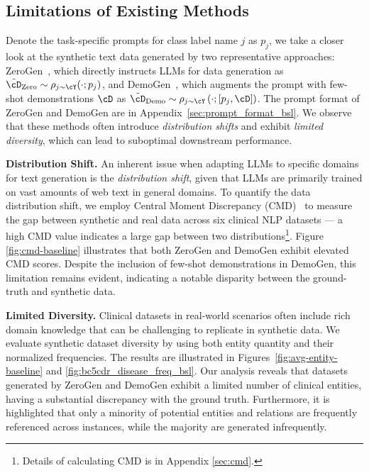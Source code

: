 \vspace{-0.5ex}
\subsection{Limitations of Existing  Methods}
\label{sec:limitations}
Denote the task-specific prompts for class label name $j$ as $p_j$, we take a closer look at the synthetic text data generated by two representative approaches: ZeroGen~\citep{ye2022zerogen}, which directly instructs LLMs for data generation as  $\tilde{\cD}_{\text{Zero}} \sim \rho_{j\sim\cY}(\cdot; p_j)$, and DemoGen~\citep{gpt3mix,meng2023tuning}, which augments the prompt with few-shot demonstrations $\cD$ as $\tilde{\cD}_{\text{Demo}} \sim \rho_{j\sim\cY}\left(\cdot; [p_j, \cD]\right)$.
The prompt format of ZeroGen and DemoGen are in Appendix~\ref{sec:prompt_format_bsl}.
We observe that these methods often introduce \textit{distribution shifts} and exhibit \textit{limited diversity}, which can lead to suboptimal downstream performance. 

\noindent \textbf{Distribution Shift.} An inherent issue when adapting LLMs to specific domains for text generation is the \emph{distribution shift}, given that LLMs are primarily trained on vast amounts of web text in general domains. 
To quantify the data distribution shift, we employ Central Moment Discrepancy (CMD)~\citep{zellinger2017central} to measure the gap between synthetic and real data across six clinical NLP datasets --- a high CMD value indicates a large gap between two distributions\footnote{Details of calculating CMD is in Appendix \ref{sec:cmd}.}. Figure \ref{fig:cmd-baseline} illustrates that both ZeroGen and DemoGen exhibit elevated CMD scores. 
Despite the inclusion of few-shot demonstrations in DemoGen, this limitation remains evident, indicating a notable disparity between the ground-truth and synthetic data.

\noindent \textbf{Limited Diversity.}
Clinical datasets in real-world scenarios often include rich domain knowledge that can be challenging to replicate in synthetic data. We evaluate synthetic dataset diversity by using both entity quantity and their normalized frequencies. The results are illustrated in Figures~\ref{fig:avg-entity-baseline} and \ref{fig:bc5cdr_disease_freq_bsl}. Our analysis reveals that datasets generated by ZeroGen and DemoGen exhibit a limited number of clinical entities, having a substantial discrepancy with the ground truth. 
Furthermore, it is highlighted that only a minority of potential entities and relations are frequently referenced across instances, while the majority are generated infrequently.

